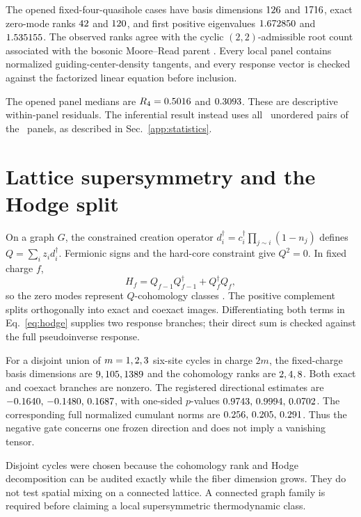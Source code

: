 \documentclass[aps,prb,onecolumn,superscriptaddress,longbibliography,floatfix]{revtex4-2}
\begin{document}
The opened fixed-four-quasihole cases have basis dimensions \(126\) and \(1716\), exact zero-mode ranks \(42\) and \(120\), and first positive eigenvalues \(1.672850\) and \(1.535155\). The observed ranks agree with the cyclic \((2,2)\)-admissible root count associated with the bosonic Moore--Read parent \cite{mooreread1991,zhang2023parent}. Every local panel contains normalized guiding-center-density tangents, and every response vector is checked against the factorized linear equation before inclusion.

The opened panel medians are \(R_4=0.5016\) and \(0.3093\). These are descriptive within-panel residuals. The inferential result instead uses all \PanelPairCount\ unordered pairs of the \PanelCount\ panels, as described in Sec.~\ref{app:statistics}.


\FloatBarrier

\section{Lattice supersymmetry and the Hodge split}
\label{app:lattice-susy}

On a graph \(G\), the constrained creation operator \(d_i^\dagger=c_i^\dagger\prod_{j\sim i}(1-n_j)\) defines \(Q=\sum_i z_i d_i^\dagger\). Fermionic signs and the hard-core constraint give \(Q^2=0\). In fixed charge \(f\),
\begin{equation}
H_f=Q_{f-1}Q_{f-1}^\dagger+Q_f^\dagger Q_f,
\label{eq:hodge}
\end{equation}
so the zero modes represent \(Q\)-cohomology classes \cite{fendley2003lattice,huijse2010cohomology}. The positive complement splits orthogonally into exact and coexact images. Differentiating both terms in Eq.~\eqref{eq:hodge} supplies two response branches; their direct sum is checked against the full pseudoinverse response.

For a disjoint union of \(m=1,2,3\) six-site cycles in charge \(2m\), the fixed-charge basis dimensions are \(9,105,1389\) and the cohomology ranks are \(2,4,8\). Both exact and coexact branches are nonzero. The registered directional estimates are \(-0.1640,\,-0.1480,\,0.1687\), with one-sided \(p\)-values \(0.9743,\,0.9994,\,0.0702\). The corresponding full normalized cumulant norms are \(0.256,\,0.205,\,0.291\). Thus the negative gate concerns one frozen direction and does not imply a vanishing tensor.

Disjoint cycles were chosen because the cohomology rank and Hodge decomposition can be audited exactly while the fiber dimension grows. They do not test spatial mixing on a connected lattice. A connected graph family is required before claiming a local supersymmetric thermodynamic class.
\end{document}
